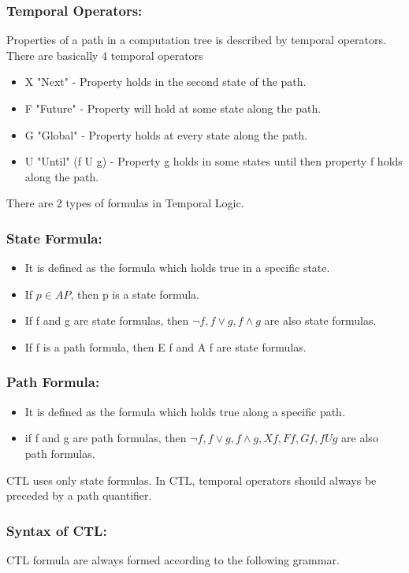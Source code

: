 \subsubsection*{Temporal Operators:}
Properties of a path in a computation tree is described by temporal operators. There are basically 4 temporal operators
\begin{itemize}
\item X "Next" - Property holds in the second state of the path.
\item F "Future" - Property will hold at some state along the path.
\item G "Global" - Property holds at every state along the path.
\item U "Until" (f U g) - Property g holds in some states until then property f holds along the path.
\end{itemize}

There are 2 types of formulas in Temporal Logic.

\subsubsection*{State Formula:}
\begin{itemize}
\item It is defined as the formula which holds true in a specific state.
\item If $p\in AP$, then p is a state formula.
\item If f and g are state formulas, then $\neg f, f\lor g,f\land g$ are also state formulas.
\item If f is a path formula, then E f and A f are state formulas.
\end{itemize}

\subsubsection*{Path Formula:}
\begin{itemize}
\item It is defined as the formula which holds true along a specific path.
\item if f and g are path formulas, then $\neg f, f\lor g,f\land g, X f,F f,G f,f U g$ are also path formulas.
\end{itemize}

CTL uses only state formulas. In CTL, temporal operators should always be preceded by a path quantifier.

\subsubsection*{Syntax of CTL:}
CTL formula are always formed according to the following grammar.

